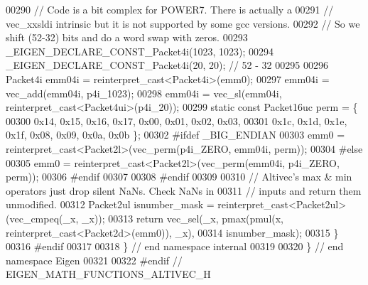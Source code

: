 \begin{DoxyCode}
00290   \textcolor{comment}{// Code is a bit complex for POWER7.  There is actually a}
00291   \textcolor{comment}{// vec\_xxsldi intrinsic but it is not supported by some gcc versions.}
00292   \textcolor{comment}{// So we shift (52-32) bits and do a word swap with zeros.}
00293   \_EIGEN\_DECLARE\_CONST\_Packet4i(1023, 1023);
00294   \_EIGEN\_DECLARE\_CONST\_Packet4i(20, 20);    \textcolor{comment}{// 52 - 32}
00295 
00296   Packet4i emm04i = \textcolor{keyword}{reinterpret\_cast<}Packet4i\textcolor{keyword}{>}(emm0);
00297   emm04i = vec\_add(emm04i, p4i\_1023);
00298   emm04i = vec\_sl(emm04i, reinterpret\_cast<Packet4ui>(p4i\_20));
00299   \textcolor{keyword}{static} \textcolor{keyword}{const} Packet16uc perm = \{
00300     0x14, 0x15, 0x16, 0x17, 0x00, 0x01, 0x02, 0x03, 
00301     0x1c, 0x1d, 0x1e, 0x1f, 0x08, 0x09, 0x0a, 0x0b \};
00302 \textcolor{preprocessor}{#ifdef  \_BIG\_ENDIAN}
00303   emm0 = \textcolor{keyword}{reinterpret\_cast<}Packet2l\textcolor{keyword}{>}(vec\_perm(p4i\_ZERO, emm04i, perm));
00304 \textcolor{preprocessor}{#else}
00305   emm0 = \textcolor{keyword}{reinterpret\_cast<}Packet2l\textcolor{keyword}{>}(vec\_perm(emm04i, p4i\_ZERO, perm));
00306 \textcolor{preprocessor}{#endif}
00307 
00308 \textcolor{preprocessor}{#endif}
00309 
00310   \textcolor{comment}{// Altivec's max & min operators just drop silent NaNs. Check NaNs in }
00311   \textcolor{comment}{// inputs and return them unmodified.}
00312   Packet2ul isnumber\_mask = \textcolor{keyword}{reinterpret\_cast<}Packet2ul\textcolor{keyword}{>}(vec\_cmpeq(\_x, \_x));
00313   \textcolor{keywordflow}{return} vec\_sel(\_x, pmax(pmul(x, reinterpret\_cast<Packet2d>(emm0)), \_x),
00314                  isnumber\_mask);
00315 \}
00316 \textcolor{preprocessor}{#endif}
00317 
00318 \}  \textcolor{comment}{// end namespace internal}
00319 
00320 \}  \textcolor{comment}{// end namespace Eigen}
00321 
00322 \textcolor{preprocessor}{#endif  // EIGEN\_MATH\_FUNCTIONS\_ALTIVEC\_H}
\end{DoxyCode}
